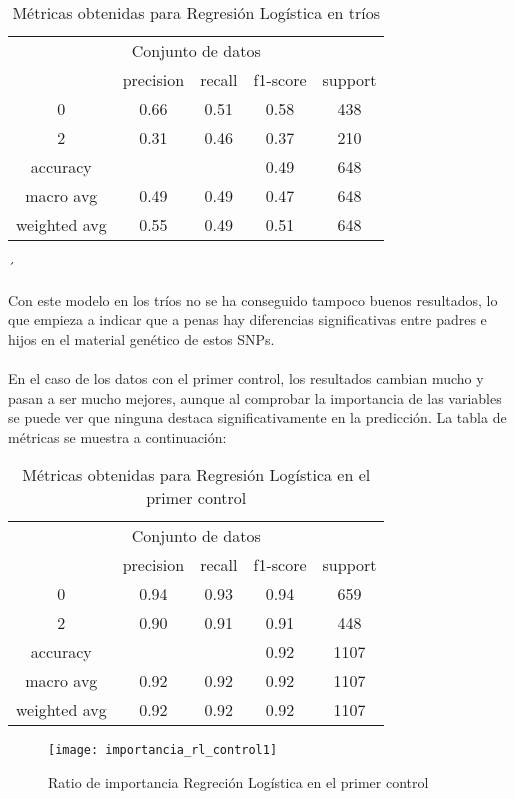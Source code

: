 \begin{table}[H]
  \centering
  \begin{tabular}{ccccc} \toprule
    \multicolumn{5}{c}{Conjunto de datos} \\ \cmidrule(r){1-5}
     & precision & recall & f1-score & support          \\ \midrule
    0 & 0.66 & 0.51 & 0.58 & 438          \\ 
    2 & 0.31 & 0.46 & 0.37 & 210          \\ 
    accuracy &  &  & 0.49 & 648          \\
    macro avg & 0.49 & 0.49 & 0.47 & 648          \\
    weighted avg & 0.55 & 0.49 & 0.51 & 648          \\ \bottomrule
  \end{tabular}
  \caption{Métricas obtenidas para Regresión Logística en tríos}
  \label{tb:info-datasets}´
\end{table}
Con este modelo en los tríos no se ha conseguido tampoco buenos resultados, lo que empieza a indicar que a penas hay diferencias significativas entre padres e hijos en el material genético de estos SNPs.\\\\
En el caso de los datos con el primer control, los resultados cambian mucho y pasan a ser mucho mejores, aunque al comprobar la importancia de las variables se puede ver que ninguna destaca significativamente en la predicción. La tabla de métricas se muestra a continuación:

\begin{table}[H]
  \centering
  \begin{tabular}{ccccc} \toprule
    \multicolumn{5}{c}{Conjunto de datos} \\ \cmidrule(r){1-5}
     & precision & recall & f1-score & support          \\ \midrule
    0 & 0.94 & 0.93 & 0.94 & 659          \\ 
    2 & 0.90 & 0.91 & 0.91 & 448          \\ 
    accuracy &  &  & 0.92 & 1107          \\
    macro avg & 0.92 & 0.92 & 0.92 & 1107          \\
    weighted avg & 0.92 & 0.92 & 0.92 & 1107          \\ \bottomrule
  \end{tabular}
  \caption{Métricas obtenidas para Regresión Logística en el primer control}
  \label{tb:info-datasets}
\end{table}

\begin{figure}[H]
  \centering
  \texttt{[image: importancia\_rl\_control1]}
  \caption{Ratio de importancia Regreción Logística en el primer control}
  \label{fig:k-nn-example}
\end{figure}



\endinput
